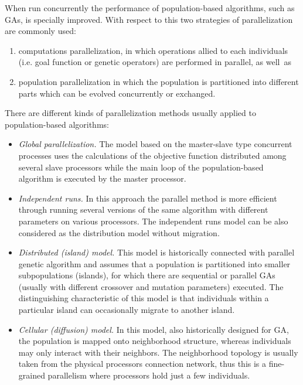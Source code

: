 When run concurrently the performance of population-based algorithms, such as GAs, is specially improved. With respect to this two strategies of
parallelization are commonly used:
\begin{enumerate}
\item computations parallelization, in which operations allied to
each individuals (i.e. goal function or genetic operators) are
performed in parallel, as well~as

\item population parallelization in which the population is
partitioned into different parts which can be evolved concurrently
or exchanged.
\end{enumerate}
There are different kinds of parallelization methods
usually applied to population-based algorithms:
\begin{itemize}
\item \emph{Global parallelization.} The model based on the
master-slave type concurrent processes uses the calculations of the
objective function distributed among several slave processors
while the main loop of the population-based algorithm is executed by the
master processor.

\item \emph{Independent runs.} In this approach the parallel method is more efficient through running several versions
of the same algorithm with different parameters on various
processors. The independent runs model can be also
considered as the distribution model without migration.


\item \emph{Distributed (island) model.} This model is historically connected with parallel genetic algorithm and assumes that a
population is partitioned into smaller subpopulations (islands),
for which there are sequential or parallel GAs (usually with different
crossover and mutation parameters) executed. The distinguishing
characteristic of this model is that individuals within a
particular island can occasionally migrate to another island.

\item \emph{Cellular (diffusion) model.} In this model, also historically designed for GA, the
population is mapped onto neighborhood structure, whereas individuals
may only interact with their neighbors. The neighborhood topology
is usually taken from the physical processors connection network,
thus this is a fine-grained parallelism where processors hold just a
few individuals.
\end{itemize}

